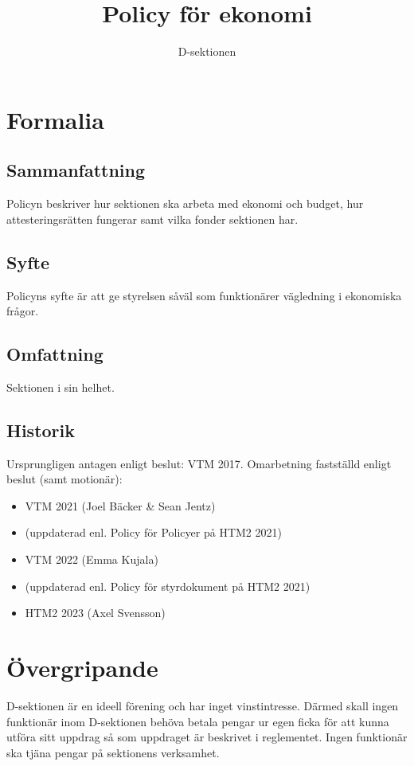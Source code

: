 \documentclass{dsekprotokoll}
\title{Policy för ekonomi}
\author{D-sektionen}
\begin{document}
\maketitle
\section{Formalia}
\subsection{Sammanfattning}
Policyn beskriver hur sektionen ska arbeta med ekonomi och budget, hur
attesteringsrätten fungerar samt vilka fonder sektionen har.

\subsection{Syfte}
Policyns syfte är att ge styrelsen såväl som funktionärer vägledning i
ekonomiska frågor.

\subsection{Omfattning}
Sektionen i sin helhet.

\subsection{Historik}
Ursprungligen antagen enligt beslut: VTM 2017.
Omarbetning fastställd enligt beslut (samt motionär):
\begin{itemize}
\item VTM 2021 (Joel Bäcker \& Sean Jentz)
\item (uppdaterad enl. Policy för Policyer på HTM2 2021)
\item VTM 2022 (Emma Kujala)
\item (uppdaterad enl. Policy för styrdokument på HTM2 2021)
\item HTM2 2023 (Axel Svensson)
\end{itemize}

\section{Övergripande}
D-sektionen är en ideell förening och har inget vinstintresse. Därmed skall
ingen funktionär inom D-sektionen behöva betala pengar ur egen ficka för att
kunna utföra sitt uppdrag så som uppdraget är beskrivet i reglementet. Ingen
funktionär ska tjäna pengar på sektionens verksamhet.
\end{document}
